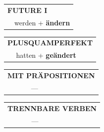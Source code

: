 \documentclass[10pt,a4paper]{revtex4-2}
\begin{document}
\begin{verbbox-acc}
\begin{tabular}{rl}
    \multicolumn{2}{l}{\textbf{FUTURE I} }\\
  &  werden + \textbf{ändern}\\
 
  \end{tabular}
\hfill
   \begin{tabular}{rl}
      \multicolumn{2}{l}{\textbf{PLUSQUAMPERFEKT}}\\
  &  hatten + \textbf{geändert}\\
  \end{tabular}
  

  \vspace{10pt}

\begin{tabular}{lll}
\multicolumn{3}{l}{\textbf{MIT PRÄPOSITIONEN}}\\
& ---\\
\end{tabular}
\hfill
\begin{tabular}{lll}
\multicolumn{3}{l}{\textbf{TRENNBARE VERBEN}}\\
& ---\\
\end{tabular}

  \vspace{-5pt}


\end{verbbox-acc}
\end{document}
